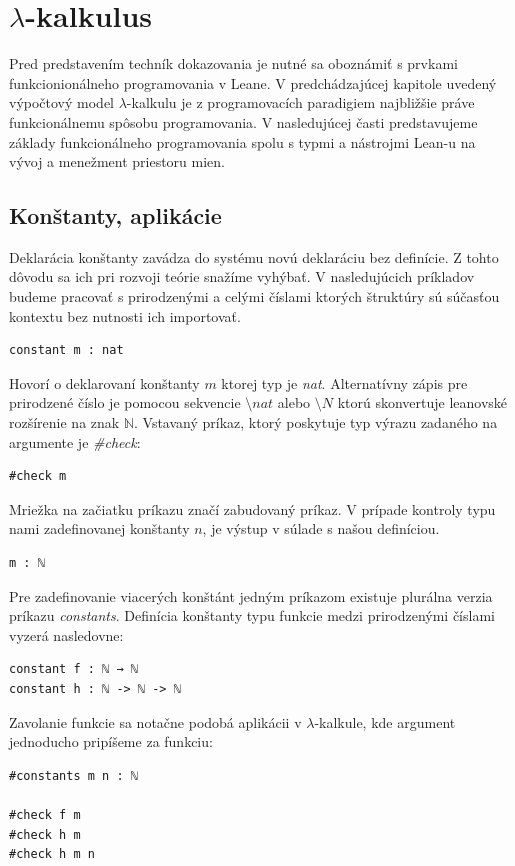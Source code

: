 \documentclass[a4paper,10pt,oneside]{report}%
\begin{document}
\section{$\lambda$-kalkulus}
    Pred predstavením techník dokazovania je nutné sa oboznámiť s prvkami funkcionionálneho
programovania v Leane.
    V predchádzajúcej kapitole uvedený výpočtový model $\lambda$-kalkulu je z programovacích 
paradigiem najbližšie práve funkcionálnemu spôsobu programovania.
V nasledujúcej časti predstavujeme základy funkcionálneho programovania spolu
    s typmi a nástrojmi Lean-u na vývoj a menežment priestoru mien.
\subsection{Konštanty, aplikácie}
    Deklarácia konštanty zavádza do systému novú deklaráciu bez definície.
    Z tohto dôvodu sa ich pri rozvoji teórie snažíme vyhýbať.
    V nasledujúcich príkladov budeme pracovať s prirodzenými a celými číslami
ktorých štruktúry sú súčasťou kontextu bez nutnosti ich importovať.
\begin{lstlisting}
constant m : nat
\end{lstlisting}
    Hovorí o deklarovaní konštanty $m$ ktorej typ je \emph{nat}.
    Alternatívny zápis pre prirodzené číslo je pomocou sekvencie $\texttt{\textbackslash}nat$
alebo $\texttt{\textbackslash}N$ ktorú skonvertuje leanovské rozšírenie na znak $\mathbb{N}$.
    Vstavaný príkaz, ktorý poskytuje typ výrazu zadaného na argumente je \emph{\#check}:
\begin{lstlisting}
#check m
\end{lstlisting}
    Mriežka na začiatku príkazu značí zabudovaný príkaz.
    V prípade kontroly typu nami zadefinovanej konštanty $n$, je výstup v súlade
s našou definíciou.
\begin{lstlisting}
m : ℕ
\end{lstlisting}
    Pre zadefinovanie viacerých konštánt jedným príkazom existuje plurálna verzia 
príkazu \emph{constants}.
    Definícia konštanty typu funkcie medzi prirodzenými číslami vyzerá nasledovne:
\begin{lstlisting}
constant f : ℕ → ℕ
constant h : ℕ -> ℕ -> ℕ
\end{lstlisting}
    Zavolanie funkcie sa notačne podobá aplikácii v $\lambda$-kalkule, kde argument
jednoducho pripíšeme za funkciu:
\begin{lstlisting}
#constants m n : ℕ

#check f m
#check h m
#check h m n
\end{lstlisting}
\end{document}
